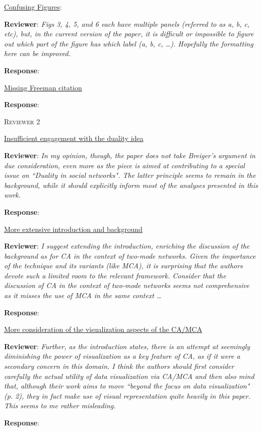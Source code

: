 \documentclass{article}
\begin{document}
\underline{Confusing Figures}:

\textbf{Reviewer}: \textit{Figs 3, 4, 5, and 6 each have multiple panels (referred to as a, b, c, etc), but, in the current version of the paper, it is difficult or impossible to figure out which part of the figure has which label (a, b, c, …). Hopefully the formatting here can be improved.}

\textbf{Response}: 


\underline{Missing Freeman citation}

\textbf{Response}:

\newpage
\textsc{Reviewer 2}

\underline{Insufficient engagement with the duality idea}

\textbf{Reviewer}: \textit{In my opinion, though, the paper does not take Breiger's argument in due consideration, even more as the piece is aimed at contributing to a special issue on ``Duality in social networks". The latter principle seems to remain in the background, while it should explicitly inform most of the analyses presented in this work.}

\textbf{Response}:

\underline{More extensive introduction and background}

\textbf{Reviewer}: \textit{I suggest extending the introduction, enriching the discussion of the background as for CA in the context of two-mode networks. Given the importance of the technique and its variants (like MCA), it is surprising that the authors devote such a limited room to the relevant framework. Consider that the discussion of CA in the context of two-mode networks seems not comprehensive as it misses the use of MCA in the same context \ldots}

\textbf{Response}:

\underline{More consideration of the visualization aspects of the CA/MCA}

\textbf{Reviewer}: \textit{Further, as the introduction states, there is an attempt at seemingly diminishing the power of visualization as a key feature of CA, as if it were a secondary concern in this domain. I think the authors should first consider carefully the actual utility of data visualization via CA/MCA and then also mind that, although their work aims to move ``beyond the focus on data visualization" (p. 2), they in fact make use of visual representation quite heavily in this paper. This seems to me rather misleading.} 

\textbf{Response}:
\end{document}
